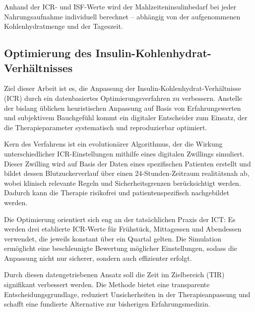 Anhand der ICR- und ISF-Werte wird der Mahlzeiteninsulinbedarf bei jeder Nahrungsaufnahme individuell berechnet – abhängig von der aufgenommenen Kohlenhydratmenge und der Tageszeit.

\subsection{Optimierung des Insulin-Kohlenhydrat-Verhältnisses}

Ziel dieser Arbeit ist es, die Anpassung der Insulin-Kohlenhydrat-Verhältnisse (ICR) durch ein datenbasiertes Optimierungsverfahren zu verbessern. Anstelle der bislang üblichen heuristischen Anpassung auf Basis von Erfahrungswerten und subjektivem Bauchgefühl kommt ein digitaler Entscheider zum Einsatz, der die Therapieparameter systematisch und reproduzierbar optimiert.

Kern des Verfahrens ist ein evolutionärer Algorithmus, der die Wirkung unterschiedlicher ICR-Einstellungen mithilfe eines digitalen Zwillings \cite[vgl.][]{Cappon2023ReplayBG} simuliert. Dieser Zwilling wird auf Basis der Daten eines spezifischen Patienten erstellt und bildet dessen Blutzuckerverlauf über einen 24-Stunden-Zeitraum realitätsnah ab, wobei klinisch relevante Regeln und Sicherheitsgrenzen berücksichtigt werden. Dadurch kann die Therapie risikofrei und patientenspezifisch nachgebildet werden.

Die Optimierung orientiert sich eng an der tatsächlichen Praxis der ICT: Es werden drei etablierte ICR-Werte für Frühstück, Mittagessen und Abendessen verwendet, die jeweils konstant über ein Quartal gelten. Die Simulation ermöglicht eine beschleunigte Bewertung möglicher Einstellungen, sodass die Anpassung nicht nur sicherer, sondern auch effizienter erfolgt.

Durch diesen datengetriebenen Ansatz soll die Zeit im Zielbereich (TIR) signifikant verbessert werden. Die Methode bietet eine transparente Entscheidungsgrundlage, reduziert Unsicherheiten in der Therapieanpassung und schafft eine fundierte Alternative zur bisherigen Erfahrungsmedizin.
